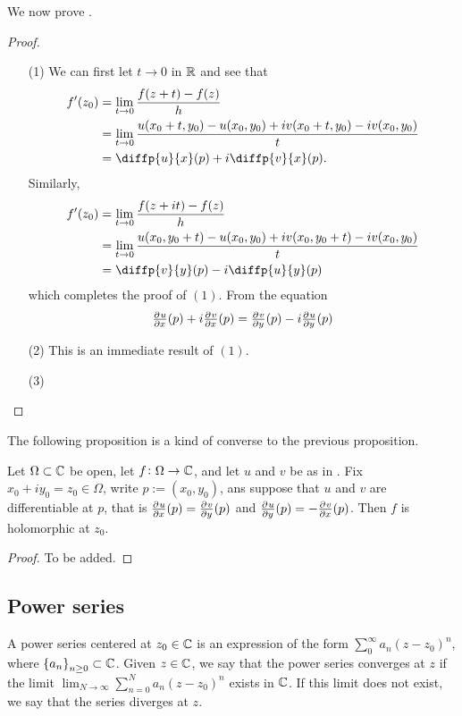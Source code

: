 \documentclass[11pt,a4paper]{article}
\begin{document}
We now prove .

\begin{proof} \phantom{}
\begin{enumerate}
  \item[(1)] We can first let $t \to 0$ in $\mathbb{R}$ and see that
  \begin{align*}
    f'(z_0) &= \lim_{t \to 0} \frac{f(z + t) - f(z)}{h} \\
            &= \lim_{t \to 0} \frac{u(x_0 + t, y_0) - u(x_0,y_0) + 
            i v(x_0 + t, y_0) - i v(x_0,y_0)}{t} \\
            &= \diffp{u}{x}(p) + i \diffp{v}{x}(p).
  \end{align*}
  Similarly,
  \begin{align*}
    f'(z_0) &= \lim_{t \to 0} \frac{f(z + i t) - f(z)}{h} \\
            &= \lim_{t \to 0} \frac{u(x_0, y_0 + t) - u(x_0,y_0) + 
            i v(x_0, y_0 + t) - i v(x_0,y_0)}{t} \\
            &= \diffp{v}{y}(p) - i \diffp{u}{y}(p)
  \end{align*}
  which completes the proof of $(1)$.
  From the equation
  \[
     \pd{u}{x}(p) + i \pd{v}{x}(p) = \pd{v}{y}(p) - i \pd{u}{y}(p)
  \]
  \item[(2)] This is an immediate result of $(1)$.
  \item[(3)]
\end{enumerate}
\end{proof}

The following proposition is a kind of converse to the previous proposition.

\begin{proposition}
  Let $\Omega \subset \mathbb{C}$ be open, let $f \colon \Omega \to \mathbb{C}$,
  and let $u$ and $v$ be as in .
  Fix $x_0 + i y_0 = z_0 \in \Omega$, write $p := (x_0,y_0)$,
  ans suppose that $u$ and $v$ are differentiable at $p$,
  that is $\pd{u}{x}(p) = \pd{v}{y}(p)$ and $\pd{u}{y}(p) = - \pd{v}{x}(p)$.
  Then $f$ is holomorphic at $z_0$.
\end{proposition}
\begin{proof}
  To be added.
\end{proof}

\subsection{Power series}

\begin{definition}
  A power series centered at $z_0 \in \mathbb{C}$ is an expression of the
  form $\sum_{0}^{\infty} a_n (z - z_0)^n$,
  where $\set{a_n}_{n \geq 0} \subset \mathbb{C}$.
  Given $z \in \mathbb{C}$, we say that the power series converges at $z$ if
  the limit $\lim_{N \to \infty} \sum_{n=0}^{N} a_n (z - z_0)^n$ exists
  in $\mathbb{C}$.
  If this limit does not exist, we say that the series diverges at $z$.
\end{definition}
\end{document}
